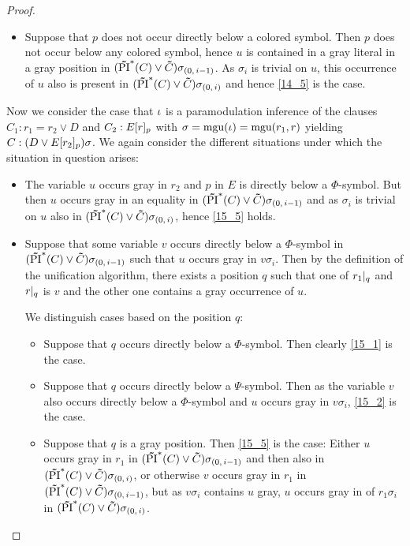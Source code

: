 \begin{proof}
\begin{itemize}
\begin{itemize}
				\item
					Suppose that $p$ does not occur directly below a colored symbol.
					Then $p$ does not occur below any colored symbol, hence $u$ is contained in a gray literal in a gray position in $(\bm\tilde{\operatorname{PI}}^{*}(C)\lor \bm\tilde{C})\sigma_{(0,\,i-1)}$. 
					As $\sigma_i$ is trivial on $u$, this occurrence of $u$ also is present in $(\bm\tilde{\operatorname{PI}}^{*}(C)\lor \bm\tilde{C})\sigma_{(0,\,i)}$ and hence \ref{14_5} is the case.

			\end{itemize}
	\end{itemize}

	Now we consider the case that $\iota$ is a paramodulation inference of the clauses $C_1: r_1=r_2 \lor D$ and $C_2: E{[r]_{p}}$ with $\sigma=\operatorname{mgu}(\iota)=\operatorname{mgu}(r_1, r)$ yielding $C: (D\lor E{[r_2]_{p}})\sigma$.
	We again consider the different situations under which the situation in question arises:

	\begin{itemize}

		\item
			The variable $u$ occurs gray in $r_2$ and $p$ in $E$ is directly below a $\Phi$-symbol. 
			But then $u$ occurs gray in an equality in $(\bm\tilde{\operatorname{PI}}^{*}(C)\lor \bm\tilde{C})\sigma_{(0,\,i-1)}$ and as $\sigma_i$ is trivial on $u$ also in $(\bm\tilde{\operatorname{PI}}^{*}(C)\lor \bm\tilde{C})\sigma_{(0,\,i)}$, hence \ref{15_5} holds.

		\item
			Suppose that some variable $v$ occurs directly below a $\Phi$-symbol in $(\bm\tilde{\operatorname{PI}}^{*}(C)\lor \bm\tilde{C})\sigma_{(0,\,i-1)}$ such that $u$ occurs gray in $v\sigma_i$.
			Then by the definition of the unification algorithm, there exists a position $q$ such that one of $r_1|_{q}$ and $r|_{q}$ is $v$ and the other one contains a gray occurrence of $u$.

			We distinguish cases based on the position $q$:

			\begin{itemize}
				\item
					Suppose that $q$ occurs directly below a $\Phi$-symbol. Then clearly \ref{15_1} is the case.

				\item
					Suppose that $q$ occurs directly below a $\Psi$-symbol. Then as the variable $v$ also occurs directly below a $\Phi$-symbol and $u$ occurs gray in $v\sigma_i$, \ref{15_2} is the case.

				\item
					Suppose that $q$ is a gray position.
					Then \ref{15_5} is the case: 
					Either $u$ occurs gray in $r_1$ in $(\bm\tilde{\operatorname{PI}}^{*}(C)\lor \bm\tilde{C})\sigma_{(0,\,i-1)}$ and then also in $(\bm\tilde{\operatorname{PI}}^{*}(C)\lor \bm\tilde{C})\sigma_{(0,\,i)}$, 
					or otherwise $v$ occurs gray in $r_1$ in $(\bm\tilde{\operatorname{PI}}^{*}(C)\lor \bm\tilde{C})\sigma_{(0,\,i-1)}$, but as $v\sigma_i$ contains $u$ gray, $u$ occurs gray in of $r_1\sigma_i$ in $(\bm\tilde{\operatorname{PI}}^{*}(C)\lor \bm\tilde{C})\sigma_{(0,\,i)}$.
					\qedhere
			\end{itemize}

	\end{itemize}

\end{proof}


